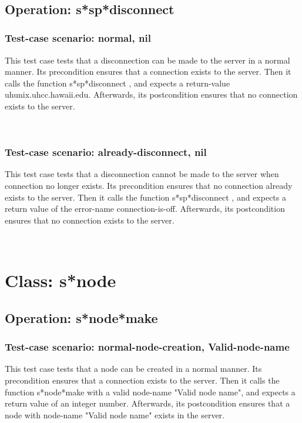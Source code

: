 \
\subsection {Operation: s*sp*disconnect}
\subsubsection {Test-case scenario: normal, nil}


This test case tests that a disconnection can be made to the server in a normal manner.
Its precondition ensures that a connection exists to the server.
Then it calls the function s*sp*disconnect , and expects a return-value uhunix.uhcc.hawaii.edu.
Afterwards, its postcondition ensures that no connection exists to the server.




\
\subsubsection {Test-case scenario: already-disconnect, nil}


This test case tests that a disconnection cannot be made to the server when connection no longer exists.
Its precondition ensures that no connection already exists to the server.
Then it calls the function s*sp*disconnect , and expects a return value of the error-name connection-is-off.
Afterwards, its postcondition ensures that no connection exists to the server.




\
\section {Class: s*node}
\subsection {Operation: s*node*make}
\subsubsection {Test-case scenario: normal-node-creation, Valid-node-name}


This test case tests that a node can be created in a normal manner.
Its precondition ensures that a connection exists to the server.
Then it calls the function s*node*make  with a valid node-name "Valid node name", and expects a return value of an integer number.
Afterwards, its postcondition ensures that a node with node-name "Valid node name" exists in the server.




